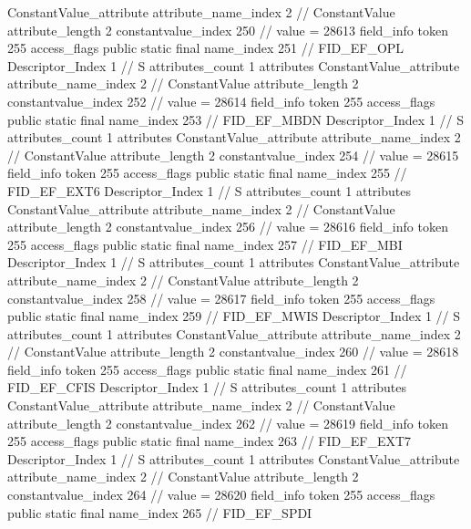 {{{{{{				ConstantValue_attribute {
					attribute_name_index	2		// ConstantValue
					attribute_length	2
					constantvalue_index	250		// value = 28613
				}
				}
			}
			field_info {
				token	255
				access_flags	public static final
				name_index	251		// FID_EF_OPL
				Descriptor_Index	1		// S
				attributes_count	1
				attributes {
				ConstantValue_attribute {
					attribute_name_index	2		// ConstantValue
					attribute_length	2
					constantvalue_index	252		// value = 28614
				}
				}
			}
			field_info {
				token	255
				access_flags	public static final
				name_index	253		// FID_EF_MBDN
				Descriptor_Index	1		// S
				attributes_count	1
				attributes {
				ConstantValue_attribute {
					attribute_name_index	2		// ConstantValue
					attribute_length	2
					constantvalue_index	254		// value = 28615
				}
				}
			}
			field_info {
				token	255
				access_flags	public static final
				name_index	255		// FID_EF_EXT6
				Descriptor_Index	1		// S
				attributes_count	1
				attributes {
				ConstantValue_attribute {
					attribute_name_index	2		// ConstantValue
					attribute_length	2
					constantvalue_index	256		// value = 28616
				}
				}
			}
			field_info {
				token	255
				access_flags	public static final
				name_index	257		// FID_EF_MBI
				Descriptor_Index	1		// S
				attributes_count	1
				attributes {
				ConstantValue_attribute {
					attribute_name_index	2		// ConstantValue
					attribute_length	2
					constantvalue_index	258		// value = 28617
				}
				}
			}
			field_info {
				token	255
				access_flags	public static final
				name_index	259		// FID_EF_MWIS
				Descriptor_Index	1		// S
				attributes_count	1
				attributes {
				ConstantValue_attribute {
					attribute_name_index	2		// ConstantValue
					attribute_length	2
					constantvalue_index	260		// value = 28618
				}
				}
			}
			field_info {
				token	255
				access_flags	public static final
				name_index	261		// FID_EF_CFIS
				Descriptor_Index	1		// S
				attributes_count	1
				attributes {
				ConstantValue_attribute {
					attribute_name_index	2		// ConstantValue
					attribute_length	2
					constantvalue_index	262		// value = 28619
				}
				}
			}
			field_info {
				token	255
				access_flags	public static final
				name_index	263		// FID_EF_EXT7
				Descriptor_Index	1		// S
				attributes_count	1
				attributes {
				ConstantValue_attribute {
					attribute_name_index	2		// ConstantValue
					attribute_length	2
					constantvalue_index	264		// value = 28620
				}
				}
			}
			field_info {
				token	255
				access_flags	public static final
				name_index	265		// FID_EF_SPDI
}}}}}
